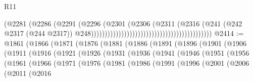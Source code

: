 \begin{lexlean}{R11}
\begin{coremodule}
{{{{{{{{{{{{{{{{{{{{{{{{{{{{{{{{{{{{{{{{{{{{{{{{{{{{{{{{{{{{{{{{{{{{{{{{{{{{{{{{{{{{{{{{{{{{{{{{{{{{{{{{{{                                                                          (@2281
                                                                            (@2286
                                                                              (@2291
                                                                                (@2296
                                                                                  (@2301
                                                                                    (@2306
                                                                                      (@2311
                                                                                        (@2316
                                                                                          (@241
                                                                                            (@242
                                                                                              @2317
                                                                                              (@244
                                                                                                @2317))
                                                                                            @248))))))))))))))))))))))))))))))))))))))))))))
@2414 := @1861
    (@1866
      (@1871
        (@1876
          (@1881
            (@1886
              (@1891
                (@1896
                  (@1901
                    (@1906
                      (@1911
                        (@1916
                          (@1921
                            (@1926
                              (@1931
                                (@1936
                                  (@1941
                                    (@1946
                                      (@1951
                                        (@1956
                                          (@1961
                                            (@1966
                                              (@1971
                                                (@1976
                                                  (@1981
                                                    (@1986
                                                      (@1991
                                                        (@1996
                                                          (@2001
                                                            (@2006
                                                              (@2011
                                                                (@2016
}}}}}}}}}}}}}}}}}}}}}}}}}}}}}}}}}}}}}}}}}}}}}}}}}}}}}}}}}}}}}}}}}}}}}}}}}}}}}}}}}}}}}}}}}}}}}}}}}}}}}}}}}}
\end{coremodule}
\end{lexlean}

